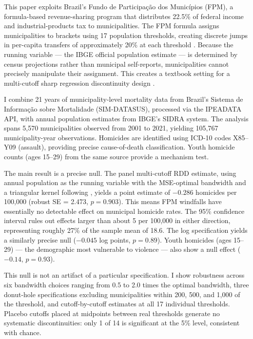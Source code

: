 \documentclass[12pt]{article}
\begin{document}
This paper exploits Brazil's Fundo de Participa\c{c}\~{a}o dos Munic\'{i}pios (FPM), a formula-based revenue-sharing program that distributes 22.5\% of federal income and industrial-products tax to municipalities. The FPM formula assigns municipalities to brackets using 17 population thresholds, creating discrete jumps in per-capita transfers of approximately 20\% at each threshold \citep{corbi2019fiscal}. Because the running variable --- the IBGE official population estimate --- is determined by census projections rather than municipal self-reports, municipalities cannot precisely manipulate their assignment. This creates a textbook setting for a multi-cutoff sharp regression discontinuity design \citep{cattaneo2016interpreting}.

I combine 21 years of municipality-level mortality data from Brazil's Sistema de Informa\c{c}\~{a}o sobre Mortalidade (SIM-DATASUS), processed via the IPEADATA API, with annual population estimates from IBGE's SIDRA system. The analysis spans 5,570 municipalities observed from 2001 to 2021, yielding 105,767 municipality-year observations. Homicides are identified using ICD-10 codes X85--Y09 (assault), providing precise cause-of-death classification. Youth homicide counts (ages 15--29) from the same source provide a mechanism test.

The main result is a precise null. The panel multi-cutoff RDD estimate, using annual population as the running variable with the MSE-optimal bandwidth and a triangular kernel following \citet{cattaneo2020practical}, yields a point estimate of $-0.286$ homicides per 100,000 (robust SE = 2.473, $p = 0.903$). This means FPM windfalls have essentially no detectable effect on municipal homicide rates. The 95\% confidence interval rules out effects larger than about 5 per 100,000 in either direction, representing roughly 27\% of the sample mean of 18.6. The log specification yields a similarly precise null ($-0.045$ log points, $p = 0.89$). Youth homicides (ages 15--29) --- the demographic most vulnerable to violence --- also show a null effect ($-0.14$, $p = 0.93$).

This null is not an artifact of a particular specification. I show robustness across six bandwidth choices ranging from 0.5 to 2.0 times the optimal bandwidth, three donut-hole specifications excluding municipalities within 200, 500, and 1,000 of the threshold, and cutoff-by-cutoff estimates at all 17 individual thresholds. Placebo cutoffs placed at midpoints between real thresholds generate no systematic discontinuities: only 1 of 14 is significant at the 5\% level, consistent with chance.
\end{document}
